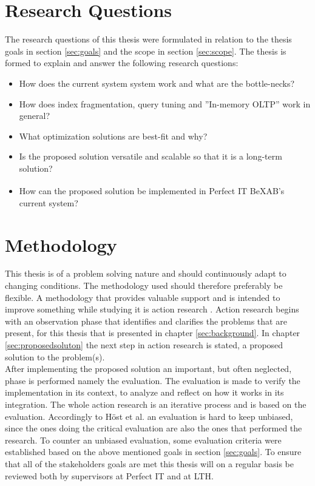 \documentclass{cslthse-msc}
\newcommand{\bex}{BeX\textsuperscript{\textregistered}}
\begin{document}
\section{Research Questions}
The research questions of this thesis were formulated in relation to the thesis goals in section \ref{sec:goals} and the scope in section \ref{sec:scope}. The thesis is formed to explain and answer the following research questions:
\begin{itemize}
\item	How does the current system system work and what are the bottle-necks?
\item 	How does index fragmentation, query tuning and ''In-memory OLTP'' work in general?
\item	What optimization solutions are best-fit and why?	
\item 	Is the proposed solution versatile and scalable so that it is a long-term solution?
\item	How can the proposed solution be implemented in Perfect IT \bex AB's current system?
\end{itemize}
\section{Methodology}
This thesis is of a problem solving nature and should continuously adapt to changing conditions. The methodology used should therefore preferably be flexible. A methodology that provides valuable support and is intended to improve something while studying it is action research \cite{robson}. Action research begins with an observation phase that identifies and clarifies the problems that are present, for this thesis that is presented in chapter \ref{sec:background}. In chapter \ref{sec:proposedsoluton} the next step in action research is stated, a proposed solution to the problem(s).\\

After implementing the proposed solution an important, but often neglected, phase is performed namely the evaluation. The evaluation is made to verify the implementation in its context, to analyze and reflect on how it works in its integration. The whole action research is an iterative process and is based on the evaluation. Accordingly to Höst et al. \cite{regnell} an evaluation is hard to keep unbiased, since the ones doing the critical evaluation are also the ones that performed the research. To counter an unbiased evaluation, some evaluation criteria were established based on the above mentioned goals in section \ref{sec:goals}. To ensure that all of the stakeholders goals are met this thesis will on a regular basis be reviewed both by supervisors at Perfect IT and at LTH.
\end{document}
